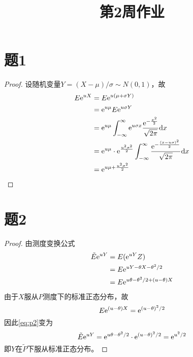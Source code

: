 \documentclass[cn]{homework}
\title{第2周作业}
\begin{document}
    \maketitle

    \section{题1}
    \begin{proof}
    设随机变量$Y=(X-\mu)/\sigma\sim N(0,1)$，故
    \begin{align*}
        E\mathrm e^{uX}&=E\mathrm e^{u(\mu+\sigma Y)}\\
                &=\mathrm e^{u\mu}E\mathrm e^{u\sigma Y}\\
                &=\mathrm e^{u\mu}
                    \int_{-\infty}^\infty
                      \mathrm e^{u\sigma x}\frac{\mathrm e^{-\frac{x^2}{2}}}{\sqrt{2\pi}}
                    \mathrm d x\\
                &=\mathrm e^{u\mu}\cdot\mathrm e^\frac{u^2\sigma^2}{2}
                    \int_{-\infty}^\infty
                    \frac{\mathrm e^{-\frac{(x-u\sigma)^2}{2}}}{\sqrt{2\pi}}
                    \mathrm d x\\
                &=\mathrm e^{u\mu+\frac{u^2\sigma^2}{2}}
    \end{align*}
    \end{proof}

    \section{题2}
    \begin{proof}
        由测度变换公式
        \begin{equation}
            \label{eq:p2}
            \begin{aligned}
            \tilde E\mathrm e^{uY}&=E(\mathrm e^{uY}Z)\\
                           &=E\mathrm e^{uY-\theta X-\theta^2/2}\\
                           &=E\mathrm e^{u\theta-\theta^2/2+(u-\theta)X}
            \end{aligned}
        \end{equation}
        由于$X$服从$P$测度下的标准正态分布，故
        \[E\mathrm e^{(u-\theta)X}=\mathrm e^{(u-\theta)^2/2}\]
        因此\cref{eq:p2}变为
        \[\tilde E\mathrm e^{uY}=\mathrm e^{u\theta-\theta^2/2}
        \cdot\mathrm e^{(u-\theta)^2/2}=\mathrm e^{u^2/2}\]
        即$Y$在$\tilde P$下服从标准正态分布。
    \end{proof}
\end{document}
